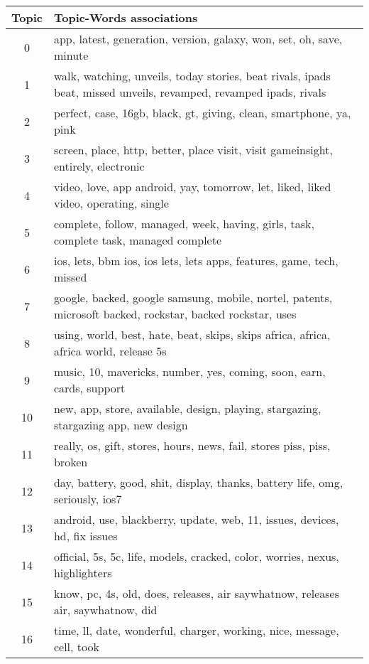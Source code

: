 \begin{table}
  \begin{tabular}{c p{16cm}} \toprule
    Topic & Topic-Words associations \\ \midrule
    0     & app, latest, generation, version, galaxy, won, set, oh, save, minute \\ \midrule
    1     & walk, watching, unveils, today stories, beat rivals, ipads beat, missed unveils, revamped, revamped ipads, rivals \\ \midrule
    2     & perfect, case, 16gb, black, gt, giving, clean, smartphone, ya, pink \\ \midrule
    3     & screen, place, http, better, place visit, visit gameinsight, entirely, electronic \\ \midrule
    4     & video, love, app android, yay, tomorrow, let, liked, liked video, operating, single \\ \midrule
    5     & complete, follow, managed, week, having, girls, task, complete task, managed complete \\ \midrule
    6     & ios, lets, bbm ios, ios lets, lets apps, features, game, tech, missed \\ \midrule
    7     & google, backed, google samsung, mobile, nortel, patents, microsoft backed, rockstar, backed rockstar, uses \\ \midrule
    8     & using, world, best, hate, beat, skips, skips africa, africa, africa world, release 5s \\ \midrule
    9     & music, 10, mavericks, number, yes, coming, soon, earn, cards, support \\ \midrule
    10    & new, app, store, available, design, playing, stargazing, stargazing app, new design \\ \midrule
    11    & really, os, gift, stores, hours, news, fail, stores piss, piss, broken \\ \midrule
    12    & day, battery, good, shit, display, thanks, battery life, omg, seriously, ios7 \\ \midrule
    13    & android, use, blackberry, update, web, 11, issues, devices, hd, fix issues \\ \midrule
    14    & official, 5s, 5c, life, models, cracked, color, worries, nexus, highlighters \\ \midrule
    15    & know, pc, 4s, old, does, releases, air saywhatnow, releases air, saywhatnow, did \\ \midrule
    16    & time, ll, date, wonderful, charger, working, nice, message, cell, took \\ \midrule

\end{tabular}
\end{table}

